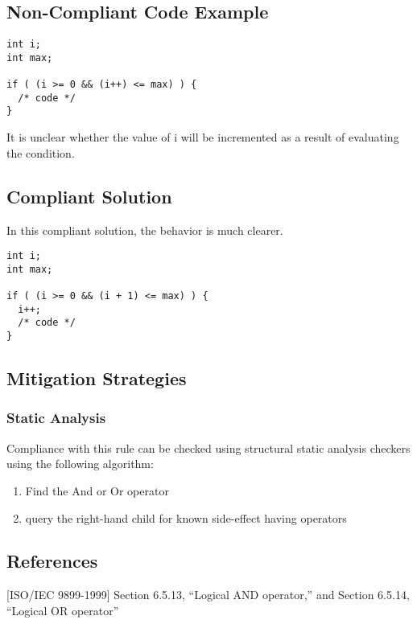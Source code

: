\subsection{Non-Compliant Code Example}


\begin{verbatim}
int i;
int max;

if ( (i >= 0 && (i++) <= max) ) {
  /* code */
}
\end{verbatim}

It is unclear whether the value of i will be incremented as a result
of evaluating the condition.

\subsection{Compliant Solution}
In this compliant solution, the behavior is much clearer.

\begin{verbatim}
int i;
int max;

if ( (i >= 0 && (i + 1) <= max) ) {
  i++;
  /* code */
}
\end{verbatim}

\subsection{Mitigation Strategies}
\subsubsection{Static Analysis} 

Compliance with this rule can be checked using structural static analysis checkers using the following algorithm:

\begin{enumerate}
\item Find the And or Or operator
\item query the right-hand child for known side-effect having operators
\end{enumerate}

\subsection{References}

[ISO/IEC 9899-1999] Section 6.5.13, ``Logical AND operator,'' and
Section 6.5.14, ``Logical OR operator''
